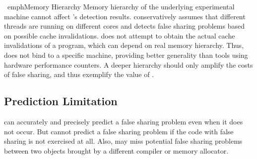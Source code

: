 \ emph{Memory Hierarchy} Memory hierarchy of the underlying experimental machine cannot affect \Predator{}'s detection results. \Predator{} conservatively assumes that different threads are running on different cores and detects false sharing problems based on possible cache invalidations. \Predator{} does not attempt to obtain the actual cache invalidations of a program, which can depend on real memory hierarchy. Thus, \Predator{} does not bind to a specific machine, providing better generality than tools using hardware performance counters. A deeper hierarchy should only amplify the costs of false sharing, and thus exemplify the value of \Predator{}.

\subsection{Prediction Limitation} 
\Predator{} can accurately and precisely predict a false sharing problem even when it does not occur. But \Predator{} cannot predict a false sharing problem if the code with false sharing is not exercised at all. Also, \Predator{} may miss potential false sharing problems between two objects brought by a different compiler or memory allocator. 